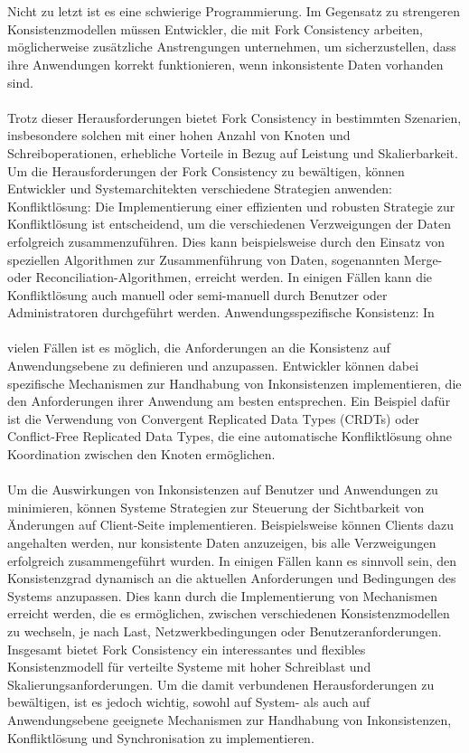 \\\\
Nicht zu letzt ist es eine schwierige Programmierung. Im Gegensatz zu strengeren Konsistenzmodellen müssen Entwickler, die mit Fork Consistency arbeiten, möglicherweise zusätzliche Anstrengungen unternehmen, um sicherzustellen, dass ihre Anwendungen korrekt funktionieren, wenn inkonsistente Daten vorhanden sind.
\\\\
Trotz dieser Herausforderungen bietet Fork Consistency in bestimmten Szenarien, insbesondere solchen mit einer hohen Anzahl von Knoten und Schreiboperationen, erhebliche Vorteile in Bezug auf Leistung und Skalierbarkeit. Um die Herausforderungen der Fork Consistency zu bewältigen, können Entwickler und Systemarchitekten verschiedene Strategien anwenden:
Konfliktlösung: Die Implementierung einer effizienten und robusten Strategie zur Konfliktlösung ist entscheidend, um die verschiedenen Verzweigungen der Daten erfolgreich zusammenzuführen. Dies kann beispielsweise durch den Einsatz von speziellen Algorithmen zur Zusammenführung von Daten, sogenannten Merge- oder Reconciliation-Algorithmen, erreicht werden. In einigen Fällen kann die Konfliktlösung auch manuell oder semi-manuell durch Benutzer oder Administratoren durchgeführt werden.
Anwendungsspezifische Konsistenz: In
\\\\
vielen Fällen ist es möglich, die Anforderungen an die Konsistenz auf Anwendungsebene zu definieren und anzupassen. Entwickler können dabei spezifische Mechanismen zur Handhabung von Inkonsistenzen implementieren, die den Anforderungen ihrer Anwendung am besten entsprechen. Ein Beispiel dafür ist die Verwendung von Convergent Replicated Data Types (CRDTs) oder Conflict-Free Replicated Data Types, die eine automatische Konfliktlösung ohne Koordination zwischen den Knoten ermöglichen.
\\\\
Um die Auswirkungen von Inkonsistenzen auf Benutzer und Anwendungen zu minimieren, können Systeme Strategien zur Steuerung der Sichtbarkeit von Änderungen auf Client-Seite implementieren. Beispielsweise können Clients dazu angehalten werden, nur konsistente Daten anzuzeigen, bis alle Verzweigungen erfolgreich zusammengeführt wurden. In einigen Fällen kann es sinnvoll sein, den Konsistenzgrad dynamisch an die aktuellen Anforderungen und Bedingungen des Systems anzupassen. Dies kann durch die Implementierung von Mechanismen erreicht werden, die es ermöglichen, zwischen verschiedenen Konsistenzmodellen zu wechseln, je nach Last, Netzwerkbedingungen oder Benutzeranforderungen.
Insgesamt bietet Fork Consistency ein interessantes und flexibles Konsistenzmodell für verteilte Systeme mit hoher Schreiblast und Skalierungsanforderungen. Um die damit verbundenen Herausforderungen zu bewältigen, ist es jedoch wichtig, sowohl auf System- als auch auf Anwendungsebene geeignete Mechanismen zur Handhabung von Inkonsistenzen, Konfliktlösung und Synchronisation zu implementieren.


